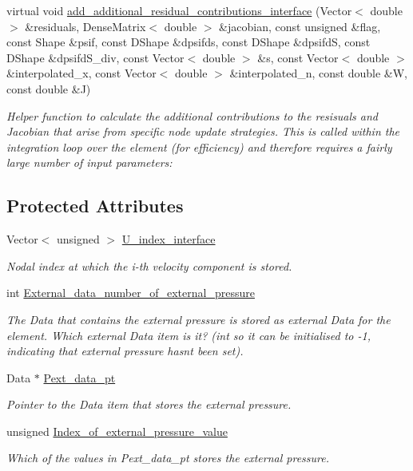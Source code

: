 \begin{DoxyCompactItemize}
virtual void \hyperlink{classoomph_1_1FluidInterfaceElement_a0bc278bb201b861f47dc846453be4c06}{add\+\_\+additional\+\_\+residual\+\_\+contributions\+\_\+interface} (Vector$<$ double $>$ \&residuals, Dense\+Matrix$<$ double $>$ \&jacobian, const unsigned \&flag, const Shape \&psif, const D\+Shape \&dpsifds, const D\+Shape \&dpsifdS, const D\+Shape \&dpsifd\+S\+\_\+div, const Vector$<$ double $>$ \&s, const Vector$<$ double $>$ \&interpolated\+\_\+x, const Vector$<$ double $>$ \&interpolated\+\_\+n, const double \&W, const double \&J)
\begin{DoxyCompactList}\small\item\em Helper function to calculate the additional contributions to the resisuals and Jacobian that arise from specific node update strategies. This is called within the integration loop over the element (for efficiency) and therefore requires a fairly large number of input parameters\+: \end{DoxyCompactList}\end{DoxyCompactItemize}
\subsection*{Protected Attributes}
\begin{DoxyCompactItemize}
\item 
Vector$<$ unsigned $>$ \hyperlink{classoomph_1_1FluidInterfaceElement_a6a818d9999c68641223edcad217a8c3f}{U\+\_\+index\+\_\+interface}
\begin{DoxyCompactList}\small\item\em Nodal index at which the i-\/th velocity component is stored. \end{DoxyCompactList}\item 
int \hyperlink{classoomph_1_1FluidInterfaceElement_a2d4c5b3e08177f5695fa9e76bf08b570}{External\+\_\+data\+\_\+number\+\_\+of\+\_\+external\+\_\+pressure}
\begin{DoxyCompactList}\small\item\em The Data that contains the external pressure is stored as external Data for the element. Which external Data item is it? (int so it can be initialised to -\/1, indicating that external pressure hasn\textquotesingle{}t been set). \end{DoxyCompactList}\item 
Data $\ast$ \hyperlink{classoomph_1_1FluidInterfaceElement_a9177eb6e96e5ac13fe092596bc104910}{Pext\+\_\+data\+\_\+pt}
\begin{DoxyCompactList}\small\item\em Pointer to the Data item that stores the external pressure. \end{DoxyCompactList}\item 
unsigned \hyperlink{classoomph_1_1FluidInterfaceElement_a2a49c97d42ce05d1876626e5918bb8eb}{Index\+\_\+of\+\_\+external\+\_\+pressure\+\_\+value}
\begin{DoxyCompactList}\small\item\em Which of the values in Pext\+\_\+data\+\_\+pt stores the external pressure. \end{DoxyCompactList}\end{DoxyCompactItemize}

